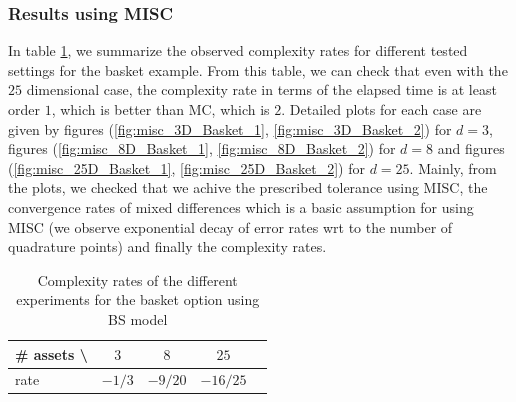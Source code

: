 \documentclass[11pt]{article}
\begin{document}
\subsubsection{Results using MISC}
In table \ref{table: Complexity rates of the different experiemnts  for the basket option using BS model}, we summarize the observed  complexity rates for different tested settings for the basket example. From this table, we can check that even with the $25$ dimensional case, the complexity rate in terms of the elapsed time is at least order $1$, which is better than MC, which is $2$. Detailed plots for each case are given by figures (\ref{fig:misc_3D_Basket_1}, \ref{fig:misc_3D_Basket_2}) for $d=3$, figures (\ref{fig:misc_8D_Basket_1}, \ref{fig:misc_8D_Basket_2}) for $d=8$ and figures (\ref{fig:misc_25D_Basket_1}, \ref{fig:misc_25D_Basket_2}) for $d=25$. Mainly, from the plots, 
we checked  that we achive the prescribed tolerance using MISC, the convergence rates of mixed differences which is a basic assumption for using MISC (we observe exponential decay of error rates wrt to the number of quadrature points) and finally the complexity rates.


\begin{table}[h!]
	\centering
	\begin{tabular}{l*{3}{c}r}
		\# assets  \textbackslash          & $3$ & $8$ & $25$   \\
		\hline
		rate   & $-1/3$ & $-9/20$ & $-16/25$  \\
		\hline
	\end{tabular}
	\caption{Complexity rates of the different experiments  for the basket option using BS model}
	\label{table: Complexity rates of the different experiemnts  for the basket option using BS model}
\end{table}	
\newpage
\end{document}
